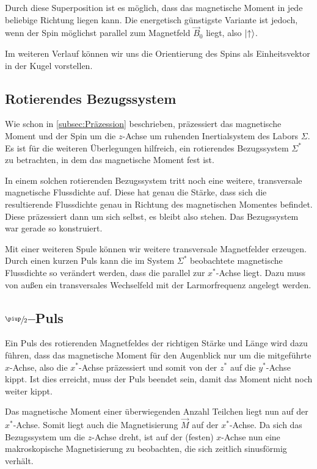 Durch diese Superposition ist es möglich, dass das magnetische Moment in jede
beliebige Richtung liegen kann. Die energetisch günstigste Variante ist jedoch,
wenn der Spin möglichst parallel zum Magnetfeld $\vec B_0$ liegt, also
$\ket\uparrow$.

Im weiteren Verlauf können wir uns die Orientierung des Spins als
Einheitsvektor in der Kugel vorstellen.

\subsection{Rotierendes Bezugssystem}

Wie schon in \ref{subsec:Präzession} beschrieben, präzessiert das magnetische
Moment und der Spin um die $z$-Achse um ruhenden Inertialsystem des Labors
$\Sigma$. Es ist für die weiteren Überlegungen hilfreich, ein rotierendes
Bezugssystem $\Sigma^*$ zu betrachten, in dem das magnetische Moment fest ist.

In einem solchen rotierenden Bezugssystem tritt noch eine weitere,
transversale magnetische Flussdichte auf. Diese hat genau die Stärke, dass
sich die resultierende Flussdichte genau in Richtung des magnetischen Momentes
befindet. Diese präzessiert dann um sich selbst, es bleibt also stehen. Das
Bezugssystem war gerade so konstruiert. \parencite{teach_spin_manual}

Mit einer weiteren Spule können wir weitere transversale Magnetfelder erzeugen.
Durch einen kurzen Puls kann die im System $\Sigma^*$ beobachtete magnetische
Flussdichte so verändert werden, dass die parallel zur $x^*$-Achse liegt. Dazu
muss von außen ein transversales Wechselfeld mit der Larmorfrequenz angelegt
werden.

\subsection{$\sfrac\piup2$–Puls}

Ein Puls des rotierenden Magnetfeldes der richtigen Stärke und Länge wird dazu
führen, dass das magnetische Moment für den Augenblick nur um die mitgeführte
$x$-Achse, also die $x^*$-Achse präzessiert und somit von der $z^*$ auf die
$y^*$-Achse kippt. Ist dies erreicht, muss der Puls beendet sein, damit das
Moment nicht noch weiter kippt.

Das magnetische Moment einer überwiegenden Anzahl Teilchen liegt nun auf der
$x^*$-Achse. Somit liegt auch die Magnetisierung $\vec M$ auf der $x^*$-Achse.
Da sich das Bezugssystem um die $z$-Achse dreht, ist auf der (festen) $x$-Achse
nun eine makroskopische Magnetisierung zu beobachten, die sich zeitlich
sinusförmig verhält.

